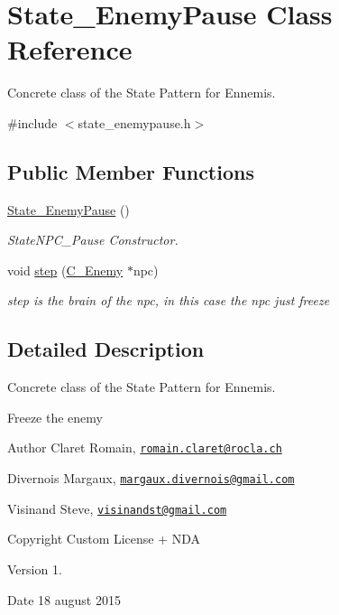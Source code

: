 \hypertarget{class_state___enemy_pause}{}\section{State\+\_\+\+Enemy\+Pause Class Reference}
\label{class_state___enemy_pause}


Concrete class of the State Pattern for Ennemis.  




{\ttfamily \#include $<$state\+\_\+enemypause.\+h$>$}

\subsection*{Public Member Functions}
\begin{DoxyCompactItemize}
\item 
\hypertarget{class_state___enemy_pause_a4cff9159a767f48c9fe8ad991e750163}{}\hyperlink{class_state___enemy_pause_a4cff9159a767f48c9fe8ad991e750163}{State\+\_\+\+Enemy\+Pause} ()\label{class_state___enemy_pause_a4cff9159a767f48c9fe8ad991e750163}

\begin{DoxyCompactList}\small\item\em State\+N\+P\+C\+\_\+\+Pause Constructor. \end{DoxyCompactList}\item 
void \hyperlink{class_state___enemy_pause_a774c679c1448f18cabf4956900e07dad}{step} (\hyperlink{class_c___enemy}{C\+\_\+\+Enemy} $\ast$npc)
\begin{DoxyCompactList}\small\item\em step is the brain of the npc, in this case the npc just freeze \end{DoxyCompactList}\end{DoxyCompactItemize}


\subsection{Detailed Description}
Concrete class of the State Pattern for Ennemis. 

Freeze the enemy \begin{DoxyAuthor}{Author}
Claret Romain, \href{mailto:romain.claret@rocla.ch}{\tt romain.\+claret@rocla.\+ch} 

Divernois Margaux, \href{mailto:margaux.divernois@gmail.com}{\tt margaux.\+divernois@gmail.\+com} 

Visinand Steve, \href{mailto:visinandst@gmail.com}{\tt visinandst@gmail.\+com} 
\end{DoxyAuthor}
\begin{DoxyCopyright}{Copyright}
Custom License + N\+D\+A 
\end{DoxyCopyright}
\begin{DoxyVersion}{Version}
1. 
\end{DoxyVersion}
\begin{DoxyDate}{Date}
18 august 2015 
\end{DoxyDate}


